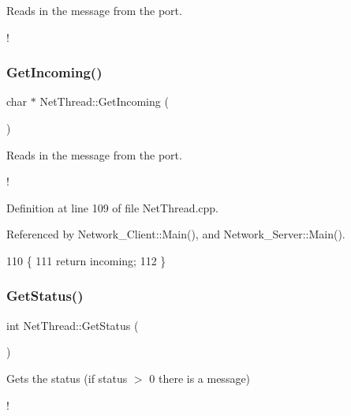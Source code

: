 Reads in the message from the port. 

! \mbox{\label{class_net_thread_ac0aa6665ec7d24cf1023c159189de3db}} 
\subsubsection{\texorpdfstring{Get\+Incoming()}{GetIncoming()}\hspace{0.1cm}{\footnotesize\ttfamily [2/2]}}
{\footnotesize\ttfamily char $\ast$ Net\+Thread\+::\+Get\+Incoming (\begin{DoxyParamCaption}{ }\end{DoxyParamCaption})}



Reads in the message from the port. 

! 

Definition at line 109 of file Net\+Thread.\+cpp.



Referenced by Network\+\_\+\+Client\+::\+Main(), and Network\+\_\+\+Server\+::\+Main().


\begin{DoxyCode}
110 \{
111     \textcolor{keywordflow}{return} incoming;
112 \}
\end{DoxyCode}
\mbox{\label{class_net_thread_adf5fda96b9b068e3525aca08e1466508}} 
\subsubsection{\texorpdfstring{Get\+Status()}{GetStatus()}\hspace{0.1cm}{\footnotesize\ttfamily [1/2]}}
{\footnotesize\ttfamily int Net\+Thread\+::\+Get\+Status (\begin{DoxyParamCaption}{ }\end{DoxyParamCaption})}



Gets the status (if status $>$ 0 there is a message) 

! \mbox{\label{class_net_thread_adf5fda96b9b068e3525aca08e1466508}} 
